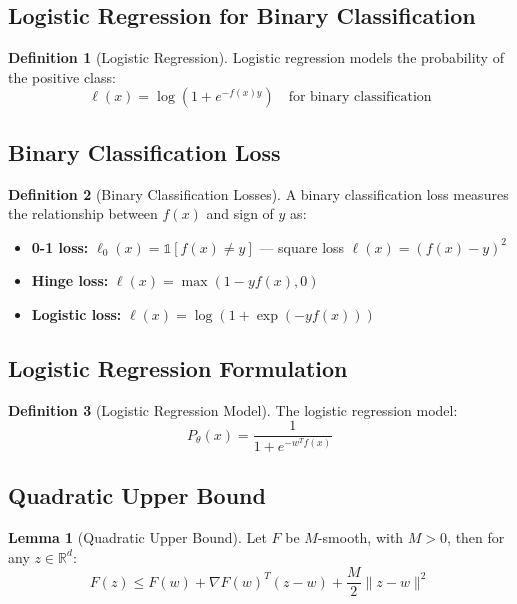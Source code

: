 \documentclass[12pt,a4paper]{article}
\theoremstyle{definition}
\newtheorem{definition}{Definition}[section]
\newtheorem{lemma}{Lemma}[section]
\begin{document}
\subsection{Logistic Regression for Binary Classification}

\begin{definition}[Logistic Regression]
Logistic regression models the probability of the positive class:
\[
\ell(x) = \log(1 + e^{-f(x)y}) \quad \text{for binary classification}
\]
\end{definition}

\subsection{Binary Classification Loss}

\begin{definition}[Binary Classification Losses]
A binary classification loss measures the relationship between $f(x)$ and sign of $y$ as:

\begin{itemize}
    \item \textbf{0-1 loss:} $\ell_0(x) = \mathbb{1}[f(x) \neq y]$ — square loss $\ell(x) = (f(x) - y)^2$
    
    \item \textbf{Hinge loss:} $\ell(x) = \max(1 - yf(x), 0)$
    
    \item \textbf{Logistic loss:} $\ell(x) = \log(1 + \exp(-yf(x)))$
\end{itemize}
\end{definition}

\subsection{Logistic Regression Formulation}

\begin{definition}[Logistic Regression Model]
The logistic regression model:
\[
P_\theta(x) = \frac{1}{1 + e^{-w^T f(x)}}
\]
\end{definition}

\subsection{Quadratic Upper Bound}

\begin{lemma}[Quadratic Upper Bound]
Let $F$ be $M$-smooth, with $M > 0$, then for any $z \in \mathbb{R}^d$:
\[
F(z) \leq F(w) + \nabla F(w)^T (z - w) + \frac{M}{2} \|z - w\|^2
\]
\end{lemma}
\end{document}
